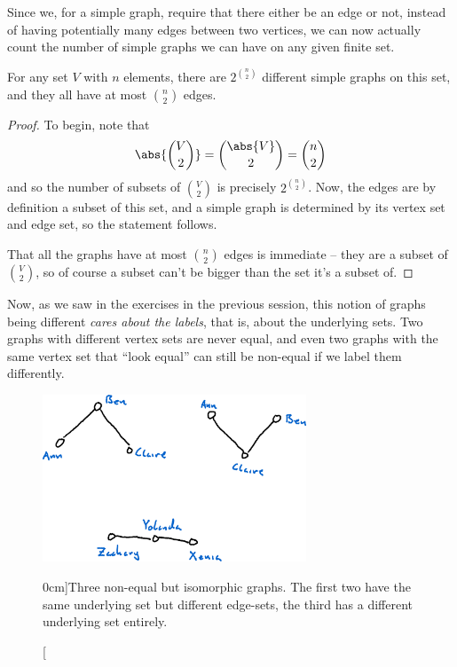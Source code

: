 \documentclass[nobib]{tufte-handout}
\begin{document}
Since we, for a simple graph, require that there either be an edge or not, instead of having potentially many edges between two vertices, we can now actually count the number of simple graphs we can have on any given finite set.

\begin{lemma}
  For any set $V$ with $n$ elements, there are $2^{\binom{n}{2}}$ different simple graphs on this set, and they all have at most $\binom{n}{2}$ edges.

  \begin{proof}
    To begin, note that
      $$\abs{\binom{V}{2}} = \binom{\abs{V}}{2} = \binom{n}{2}$$
    and so the number of subsets of $\binom{V}{2}$ is precisely $2^{\binom{n}{2}}$. Now, the edges are by definition a subset of this set, and a simple graph is determined by its vertex set and edge set, so the statement follows.

    That all the graphs have at most $\binom{n}{2}$ edges is immediate -- they are a subset of $\binom{V}{2}$, so of course a subset can't be bigger than the set it's a subset of.
  \end{proof}
\end{lemma}

Now, as we saw in the exercises in the previous session, this notion of graphs being different \emph{cares about the labels}, that is, about the underlying sets. Two graphs with different vertex sets are never equal, and even two graphs with the same vertex set that ``look equal'' can still be non-equal if we label them differently.

\begin{figure}
  \centering
  \includegraphics[width=0.7\textwidth]{graphics/L2_eulerianity_subgraphs/isomorphic_but_not_equal.png}
  \caption[][0cm]{Three non-equal but isomorphic graphs. The first two have the same underlying set but different edge-sets, the third has a different underlying set entirely.}
  \label{fig:isomorphic_but_not_equal}
\end{figure}
\end{document}
